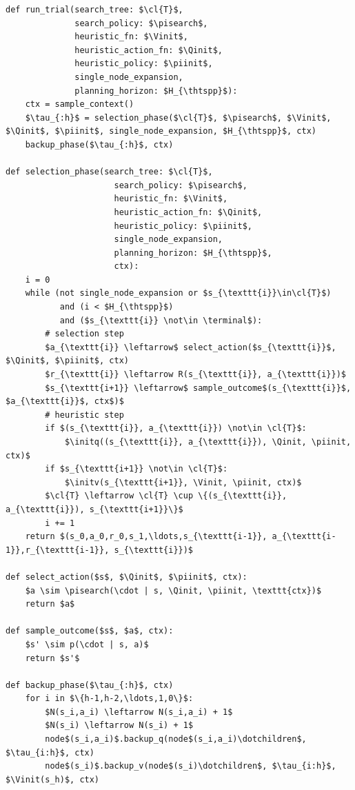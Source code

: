     
    \begin{Listing}
        \begin{lstlisting}
def run_trial(search_tree: $\cl{T}$, 
              search_policy: $\pisearch$, 
              heuristic_fn: $\Vinit$,
              heuristic_action_fn: $\Qinit$,
              heuristic_policy: $\piinit$,
              single_node_expansion,
              planning_horizon: $H_{\thtspp}$):
    ctx = sample_context()
    $\tau_{:h}$ = selection_phase($\cl{T}$, $\pisearch$, $\Vinit$, $\Qinit$, $\piinit$, single_node_expansion, $H_{\thtspp}$, ctx)
    backup_phase($\tau_{:h}$, ctx)

def selection_phase(search_tree: $\cl{T}$, 
                      search_policy: $\pisearch$, 
                      heuristic_fn: $\Vinit$,
                      heuristic_action_fn: $\Qinit$,
                      heuristic_policy: $\piinit$,
                      single_node_expansion,
                      planning_horizon: $H_{\thtspp}$,
                      ctx):
    i = 0
    while (not single_node_expansion or $s_{\texttt{i}}\in\cl{T}$) 
           and (i < $H_{\thtspp}$) 
           and ($s_{\texttt{i}} \not\in \terminal$):
        # selection step
        $a_{\texttt{i}} \leftarrow$ select_action($s_{\texttt{i}}$, $\Qinit$, $\piinit$, ctx) 
        $r_{\texttt{i}} \leftarrow R(s_{\texttt{i}}, a_{\texttt{i}})$
        $s_{\texttt{i+1}} \leftarrow$ sample_outcome$(s_{\texttt{i}}$, $a_{\texttt{i}}$, ctx$)$
        # heuristic step
        if $(s_{\texttt{i}}, a_{\texttt{i}}) \not\in \cl{T}$:
            $\initq((s_{\texttt{i}}, a_{\texttt{i}}), \Qinit, \piinit, ctx)$
        if $s_{\texttt{i+1}} \not\in \cl{T}$:
            $\initv(s_{\texttt{i+1}}, \Vinit, \piinit, ctx)$
        $\cl{T} \leftarrow \cl{T} \cup \{(s_{\texttt{i}}, a_{\texttt{i}}), s_{\texttt{i+1}}\}$
        i += 1
    return $(s_0,a_0,r_0,s_1,\ldots,s_{\texttt{i-1}}, a_{\texttt{i-1}},r_{\texttt{i-1}}, s_{\texttt{i}})$

def select_action($s$, $\Qinit$, $\piinit$, ctx):
    $a \sim \pisearch(\cdot | s, \Qinit, \piinit, \texttt{ctx})$
    return $a$

def sample_outcome($s$, $a$, ctx):
    $s' \sim p(\cdot | s, a)$
    return $s'$

def backup_phase($\tau_{:h}$, ctx)
    for i in $\{h-1,h-2,\ldots,1,0\}$:
        $N(s_i,a_i) \leftarrow N(s_i,a_i) + 1$
        $N(s_i) \leftarrow N(s_i) + 1$
        node$(s_i,a_i)$.backup_q(node$(s_i,a_i)\dotchildren$, $\tau_{i:h}$, ctx)
        node$(s_i)$.backup_v(node$(s_i)\dotchildren$, $\tau_{i:h}$, $\Vinit(s_h)$, ctx)
        \end{lstlisting}
        \caption{Pseudocode for running a trial in \thtspp.}
        \label{lst:2:thts_trial}
    \end{Listing}



